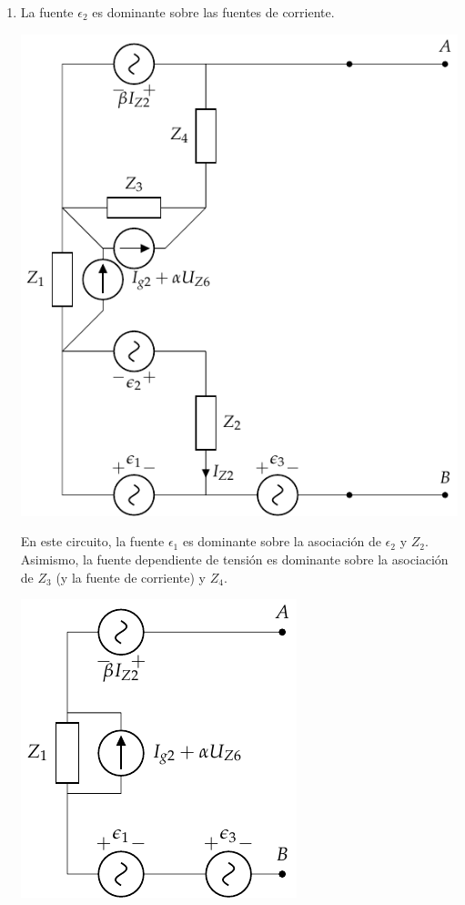 \documentclass[12pt]{article}
\begin{document}
\begin{enumerate}
\item La fuente $\epsilon_2$ es dominante sobre las fuentes de
  corriente.

  \includegraphics[scale=0.7]{figs/thevenin_dominancia.pdf}

  En este circuito, la fuente $\epsilon_1$ es dominante sobre la
  asociación de $\epsilon_2$ y $Z_2$. Asimismo, la fuente dependiente
  de tensión es dominante sobre la asociación de $Z_3$ (y la fuente de
  corriente) y $Z_4$.
  
    \includegraphics[]{figs/thevenin_dominancia2.pdf}
  

\end{enumerate}
\end{document}
